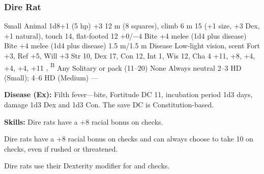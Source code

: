 \subsubsection{Dire Rat}
\begin{MonsterStats}
{Small Animal}
{1d8+1 (5 hp)}
{+3}
{12 m (8 squares), climb 6 m}
{15 (+1 size, +3 Dex, +1 natural), touch 14, flat-footed 12}
{+0/$-4$}
{Bite +4 melee (1d4 plus disease)}
{Bite +4 melee (1d4 plus disease)}
{1.5 m/1.5 m}
{Disease}
{Low-light vision, scent}
{Fort +3, Ref +5, Will +3}
{Str 10, Dex 17, Con 12, Int 1, Wis 12, Cha 4}
{ +11,  +8,  +4,  +4,  +4,  +11}
{, \textsuperscript{B}}
{Any}
{Solitary or pack (11--20)}
{\onethird}
{None}
{Always neutral}
{2--3 HD (Small); 4--6 HD (Medium)}
{---}
\end{MonsterStats}

\textbf{Disease (Ex):} Filth fever---bite, Fortitude DC 11, incubation period 1d3 days, damage 1d3 Dex and 1d3 Con. The save DC is Constitution-based.

\textbf{Skills:} Dire rats have a +8 racial bonus on  checks.

Dire rats have a +8 racial bonus on  checks and can always choose to take 10 on  checks, even if rushed or threatened.

Dire rats use their Dexterity modifier for  and  checks.
